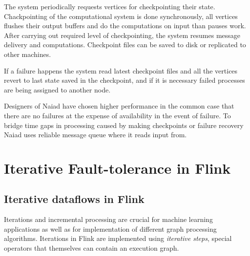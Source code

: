 The system periodically requests vertices for checkpointing their state. Chackpointing of the computational system is done synchronously,  all vertices flushes their output buffers and do the computations on input than pauses work. After carrying out required level of checkpointing, the system resumes message delivery and computations. Checkpoint files can be saved to disk or replicated to other machines.

If a failure happens the system read latest checkpoint files and  all the vertices revert to last state saved in the checkpoint, and if it is necessary failed processes are being assigned to another node.

Designers of Naiad have chosen higher performance in the common case that there are no failures at the expense of availability in the event of failure. To bridge time gaps in processing caused by making checkpoints or failure recovery Naiad uses reliable message queue where it reads input from. 

\section{Iterative Fault-tolerance in Flink}
\subsection{Iterative dataflows in Flink}
Iterations and incremental processing are crucial for machine learning applications as well as for implementation of different graph processing algorithms. Iterations in Flink are implemented using \textit{iterative steps}, special operators that themselves can contain an execution graph.
